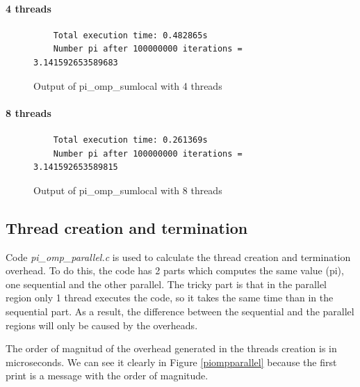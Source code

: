 \documentclass[12pt, a4paper]{article}
\begin{document}
\paragraph{4 threads}

\begin{figure}[H]
	\begin{lstlisting}
	Total execution time: 0.482865s
	Number pi after 100000000 iterations = 3.141592653589683					
	\end{lstlisting}
	\caption{Output of pi\_omp\_sumlocal with 4 threads}
\end{figure}

\paragraph{8 threads}

\begin{figure}[H]
	\begin{lstlisting}
	Total execution time: 0.261369s
	Number pi after 100000000 iterations = 3.141592653589815		
	\end{lstlisting}
	\caption{Output of pi\_omp\_sumlocal with 8 threads}
\end{figure}

\subsection{Thread creation and termination}

Code \textit{pi\_omp\_parallel.c} is used to calculate the thread creation and termination overhead. To do this, the code has 2 parts which computes the same value (pi), one sequential and the other parallel. The tricky part is that in the parallel region only 1 thread executes the code, so it takes the same time than in the sequential part. As a result, the difference between the sequential and the parallel regions will only be caused by the overheads.

The order of magnitud of the overhead generated in the threads creation is in microseconds. We can see it clearly in Figure \ref{piompparallel} because the first print is a message with the order of magnitude.
\end{document}
